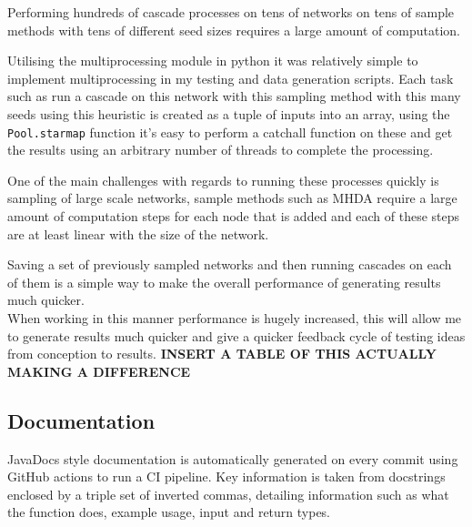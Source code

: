 \documentclass{article}
\begin{document}
Performing hundreds of cascade processes on tens of networks on tens of sample methods with tens of different seed sizes requires a large amount of computation.

Utilising the multiprocessing module in python it was relatively simple to implement multiprocessing in my testing and data generation scripts.
Each task such as run a cascade on this network with this sampling method with this many seeds using this heuristic is created as a tuple of inputs into an array, using the \texttt{Pool.starmap} function it's easy to perform a catchall function on these and get the results using an arbitrary number of threads to complete the processing.

One of the main challenges with regards to running these processes quickly is sampling of large scale networks, sample methods such as MHDA require a large amount of computation steps for each node that is added and each of these steps are at least linear with the size of the network.

Saving a set of previously sampled networks and then running cascades on each of them is a simple way to make the overall performance of generating results much quicker.
\\

When working in this manner performance is hugely increased, this will allow me to generate results much quicker and give a quicker feedback cycle of testing ideas from conception to results. 
\textbf{INSERT A TABLE OF THIS ACTUALLY MAKING A DIFFERENCE}


\subsection{Documentation}

JavaDocs style documentation is automatically generated on every commit using GitHub actions to run a CI pipeline.
Key information is taken from docstrings enclosed by a triple set of inverted commas, detailing information such as what the function does, example usage, input and return types.
\end{document}
